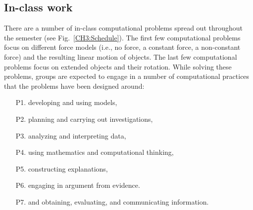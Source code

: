 \documentclass{msuphddissertation}
\begin{document}
\begin{doublespace}
\section{In-class work}\label{CH3:InClassWork}

There are a number of in-class computational problems spread out throughout the semester (see Fig.~\ref{CH3:Schedule}).  The first few computational problems focus on different force models (i.e., no force, a constant force, a non-constant force) and the resulting linear motion of objects.  The last few computational problems focus on extended objects and their rotation.  While solving these problems, groups are expected to engage in a number of computational practices that the problems have been designed around: \begin{enumerate}
\item[P1.] developing and using models,
\item[P2.] planning and carrying out investigations,
\item[P3.] analyzing and interpreting data,
\item[P4.] using mathematics and computational thinking,
\item[P5.] constructing explanations,
\item[P6.] engaging in argument from evidence.
\item[P7.] and obtaining, evaluating, and communicating information.
\end{enumerate}



\end{doublespace}
\end{document}
